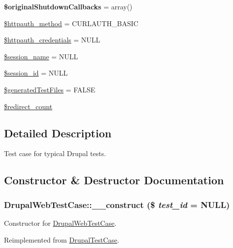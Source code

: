 \begin{DoxyCompactItemize}
\item 
\hypertarget{classDrupalWebTestCase_ae5749f8cd1f0e41c24d128abf0cc3d39}{
{\bfseries \$originalShutdownCallbacks} = array()}
\label{classDrupalWebTestCase_ae5749f8cd1f0e41c24d128abf0cc3d39}

\item 
\hyperlink{classDrupalWebTestCase_a809845c0dd606b1e0511eb52ff8450da}{\$httpauth\_\-method} = CURLAUTH\_\-BASIC
\item 
\hyperlink{classDrupalWebTestCase_a1d8ed55611dfba216fc9a7eaaca59b8d}{\$httpauth\_\-credentials} = NULL
\item 
\hyperlink{classDrupalWebTestCase_acb07ddaedaef0c5d08610666ec74cb45}{\$session\_\-name} = NULL
\item 
\hyperlink{classDrupalWebTestCase_a2f8ec9f9c31df56f5502f473e7b78e31}{\$session\_\-id} = NULL
\item 
\hyperlink{classDrupalWebTestCase_ad7465c96d4458e825ce9ff381a88acae}{\$generatedTestFiles} = FALSE
\item 
\hyperlink{classDrupalWebTestCase_a541a9f9c8bbb5fe5841544382ed6e29e}{\$redirect\_\-count}
\end{DoxyCompactItemize}


\subsection{Detailed Description}
Test case for typical Drupal tests. 

\subsection{Constructor \& Destructor Documentation}
\hypertarget{classDrupalWebTestCase_a76d165c12dc6042bae017b5c521e6ffa}{
\subsubsection[{\_\-\_\-construct}]{\setlength{\rightskip}{0pt plus 5cm}DrupalWebTestCase::\_\-\_\-construct (\$ {\em test\_\-id} = {\ttfamily NULL})}}
\label{classDrupalWebTestCase_a76d165c12dc6042bae017b5c521e6ffa}
Constructor for \hyperlink{classDrupalWebTestCase}{DrupalWebTestCase}. 

Reimplemented from \hyperlink{classDrupalTestCase_abb2516192da25b89bec5f5a4a7e91aab}{DrupalTestCase}.

